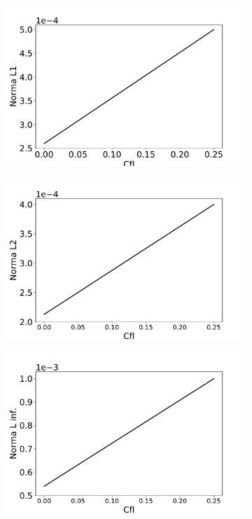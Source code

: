 \documentclass[10pt,twoside,a4paper]{article}
\begin{document}
	\vspace*{-4mm}
	\begin{figure}[h!]
	\centering
	\begin{subfigure}[t]{0.3\textwidth}
		\centering
		\includegraphics[scale=0.3]{L1}
		\label{fig:erro}
	\end{subfigure}
	\begin{subfigure}[t]{0.3\textwidth}
		\centering
		\includegraphics[scale=0.3]{L2}
		\label{fig:erro}
	\end{subfigure}
	\begin{subfigure}[t]{0.3\textwidth}
		\centering
		\includegraphics[scale=0.3]{L3}

\end{subfigure}
\end{figure}
\end{document}
